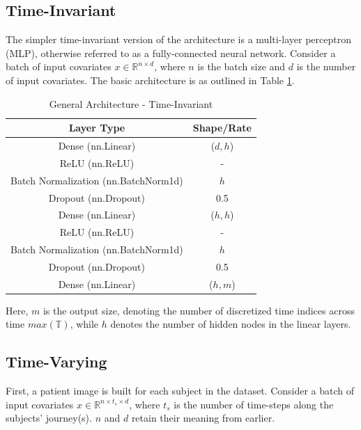 \documentclass[%
 twocolumn,
 reprint,
 amsmath,amssymb,
 aps,nofootinbib
]{revtex4-2}
\begin{document}
\subsection{\label{time_invar_arch}Time-Invariant}
The simpler time-invariant version of the architecture is a multi-layer perceptron (MLP), otherwise referred to as a fully-connected neural network. Consider a batch of input covariates $x \in \mathbb{R}^{n\times d}$, where $n$ is the batch size and $d$ is the number of input covariates. The basic architecture is as outlined in Table \ref{tab:arch1}.\\

\begin{table}[H]
  \centering
  \begin{tabular}{|c|c|}
    \hline
    \textbf{Layer Type} & \textbf{Shape/Rate} \\
    \hline
    Dense (nn.Linear) & ($d, h$) \\
    ReLU (nn.ReLU) & - \\
    Batch Normalization (nn.BatchNorm1d) & $h$ \\
    Dropout (nn.Dropout) & 0.5 \\ 
    Dense (nn.Linear) & ($h, h$) \\
    ReLU (nn.ReLU) & - \\
    Batch Normalization (nn.BatchNorm1d) & $h$ \\
    Dropout (nn.Dropout) & 0.5 \\
    Dense (nn.Linear) & ($h, m$) \\
    \hline
  \end{tabular}
  \caption[General Architecture Time-Invariant]{General Architecture - Time-Invariant}
  \label{tab:arch1}
\end{table}

Here, $m$ is the output size, denoting the number of discretized time indices across time $max(\mathbb{T})$, while $h$ denotes the number of hidden nodes in the linear layers.\\


\subsection{\label{time_var_arch}Time-Varying}
First, a patient image is built for each subject in the dataset. Consider a batch of input covariates $x \in \mathbb{R}^{n\times t_s \times d}$, where $t_s$ is the number of time-steps along the subjects' journey(s). $n$ and $d$ retain their meaning from earlier. \\
\end{document}
